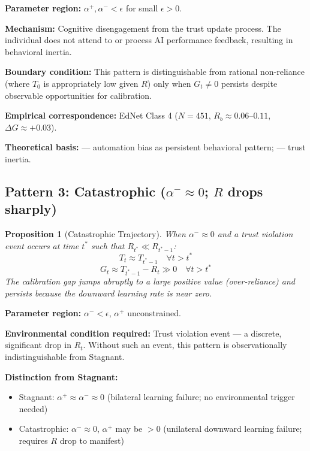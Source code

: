 \documentclass[12pt]{article}
\newtheorem{proposition}{Proposition}
\begin{document}
\textbf{Parameter region:} $\alpha^+, \alpha^- < \epsilon$
for small $\epsilon > 0$.

\textbf{Mechanism:} Cognitive disengagement from the trust
update process. The individual does not attend to or process
AI performance feedback, resulting in behavioral inertia.

\textbf{Boundary condition:} This pattern is distinguishable from
rational non-reliance (where $T_0$ is appropriately low given $R$)
only when $G_t \neq 0$ persists despite observable opportunities
for calibration.

\textbf{Empirical correspondence:}
EdNet Class 4 ($N=451$, $R_b \approx 0.06$--$0.11$, $\Delta G \approx +0.03$).

\textbf{Theoretical basis:}
\citet{parasuraman1997humans} --- automation bias as persistent
behavioral pattern; \citet{goddard2012automation} --- trust inertia.


\subsection{Pattern 3: Catastrophic ($\alpha^- \approx 0$; $R$ drops sharply)}

\begin{proposition}[Catastrophic Trajectory]
  When $\alpha^- \approx 0$ and a trust violation event occurs
  at time $t^*$ such that $R_{t^*} \ll R_{t^*-1}$:
  \begin{equation}
    T_{t} \approx T_{t^*-1} \quad \forall t > t^*
  \end{equation}
  \begin{equation}
    G_t \approx T_{t^*-1} - R_{t} \gg 0 \quad \forall t > t^*
  \end{equation}
  The calibration gap jumps abruptly to a large positive value
  (over-reliance) and persists because the downward learning
  rate is near zero.
\end{proposition}

\textbf{Parameter region:} $\alpha^- < \epsilon$, $\alpha^+$
unconstrained.

\textbf{Environmental condition required:}
Trust violation event --- a discrete, significant drop in $R_t$.
Without such an event, this pattern is observationally
indistinguishable from Stagnant.

\textbf{Distinction from Stagnant:}
\begin{itemize}
  \item Stagnant: $\alpha^+ \approx \alpha^- \approx 0$
    (bilateral learning failure; no environmental trigger needed)
  \item Catastrophic: $\alpha^- \approx 0$, $\alpha^+$ may be $> 0$
    (unilateral downward learning failure; requires $R$ drop to manifest)
\end{itemize}
\end{document}
